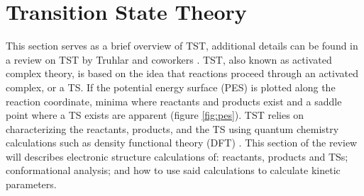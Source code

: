 \documentclass[preprint, 11pt]{elsarticle} %
\begin{document}
\section{Transition State Theory}

This section serves as a brief overview of TST, additional details can be found in a review on TST by Truhlar and coworkers \cite{truhlar:1996}.
TST, also known as activated complex theory, is based on the idea that reactions proceed through an activated complex, or a TS.
If the potential energy surface (PES) is plotted along the reaction coordinate, minima where reactants and products exist and a saddle point where a TS exists are apparent (figure \ref{fig:pes}). 
TST relies on characterizing the reactants, products, and the TS using quantum chemistry calculations such as density functional theory (DFT) \cite{DFT:1964}.
This section of the review will describes electronic structure calculations of: reactants, products and TSs; conformational analysis; and how to use said calculations to calculate kinetic parameters.
\end{document}
